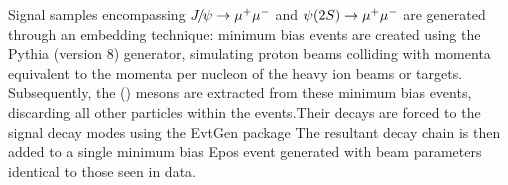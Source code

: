 Signal samples encompassing ${{J\mskip -3mu/\mskip -2mu\psi}} \rightarrow \mu^+\mu^-$ and ${\psi{(2S)}} \rightarrow \mu^+\mu^-$ are generated through an embedding technique: minimum bias events are created using the Pythia (version 8) generator, simulating proton beams colliding with momenta equivalent to the momenta per nucleon of the heavy ion beams or targets. Subsequently, the \jpsi (\psitwos) mesons are extracted from these minimum bias events, discarding all other particles within the events.Their decays are forced to the signal decay modes using the EvtGen package The resultant decay chain is then added to a single minimum bias Epos event generated with beam parameters identical to those seen in data.


